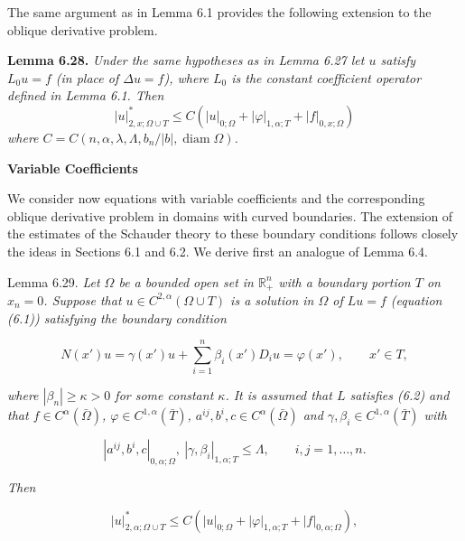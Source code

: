 The same argument as in Lemma 6.1 provides the following extension to the
oblique derivative problem.

\textbf{Lemma 6.28.} \textit{Under the same hypotheses as in Lemma 6.27 let $u$ satisfy $L_0u=f$
(in place of $\Delta u=f$), where $L_0$ is the constant coefficient operator defined in Lemma
6.1. Then}
\begin{equation}\tag{6.71}
|u|_{2,x;\Omega\cup T}^*\le C(|u|_{0;\Omega}+|\varphi|_{1,\alpha;T}+|f|_{0,x;\Omega})
\end{equation}
\textit{where $C=C(n,\alpha,\lambda,\Lambda,b_n/|b|,\operatorname{diam}\Omega)$.}

\textbf{Variable Coefficients}

We consider now equations with variable coefficients and the corresponding oblique
derivative problem in domains with curved boundaries. The extension of the
estimates of the Schauder theory to these boundary conditions follows closely the
ideas in Sections 6.1 and 6.2. We derive first an analogue of Lemma 6.4.


\providecommand{\R}{\mathbb{R}}
\providecommand{\cN}{N}
\providecommand{\cL}{L}

Lemma 6.29. \emph{Let $\Omega$ be a bounded open set in $\R_+^n$ with a boundary portion $T$ on
$x_n=0$. Suppose that $u\in C^{2,\alpha}(\Omega\cup T)$ is a solution in $\Omega$ of $Lu=f$ (equation (6.1))
satisfying the boundary condition}

\begin{equation}\tag{6.72}
N(x')u=\gamma(x')u+\sum_{i=1}^n \beta_i(x')D_i u=\varphi(x'), \qquad x'\in T,
\end{equation}

\emph{where $|\beta_n|\ge \kappa>0$ for some constant $\kappa$. It is assumed that $L$ satisfies (6.2) and that
$f\in C^\alpha(\bar\Omega)$, $\varphi\in C^{1,\alpha}(\bar T)$, $a^{ij}, b^i, c\in C^\alpha(\bar\Omega)$ and $\gamma, \beta_i\in C^{1,\alpha}(\bar T)$ with}

\[
|a^{ij}, b^i, c|_{0,\alpha;\Omega},\ |\gamma, \beta_i|_{1,\alpha;T}\le \Lambda,\qquad i,j=1,\ldots,n.
\]

\emph{Then}

\begin{equation}\tag{6.73}
|u|_{2,\alpha;\Omega\cup T}^*\le C(|u|_{0;\Omega}+|\varphi|_{1,\alpha;T}+|f|_{0,\alpha;\Omega}),
\end{equation}

